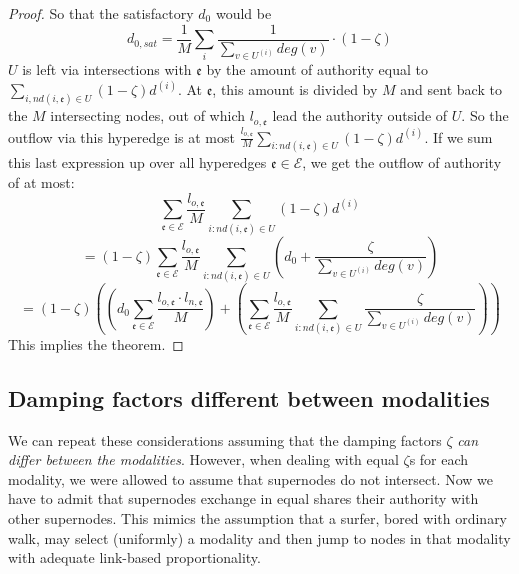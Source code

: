 \documentclass{fundam}
\newcommand{\Bem}[1]{}
\newcommand{\HEM}{\mathcal{E}}
\newcommand{\hem}{\mathfrak{e}}
\begin{document}
\begin{proof}
So that the satisfactory $d_0$ would be
$$ d_{0,sat}=  \frac1M\sum_i\frac{1 }{\sum_{v \in U^{(i)}}deg(v)}{\cdot}(1-\zeta)
 $$
$U$ is left via intersections with $\hem$ by the amount of authority equal to
$\sum_{i, nd(i,\hem)\in U} (1-\zeta)d^{(i)} $.
At $\hem$,  this amount is divided by $M$ and sent back to the $M$ intersecting nodes, out of which $l_{o,\hem}$ lead the authority outside of $U$.  So the outflow via this hyperedge is at most
$\frac{ l_{o,\hem}}{M}\sum_{i: nd(i,\hem)\in U} (1-\zeta)d^{(i)} $.
If we sum this last expression up over all hyperedges $\hem \in \HEM$, we get the outflow of authority of at most:
\begin{equation*}
\sum_{\hem\in\HEM}\frac{ l_{o,\hem}}{M}\sum_{i: nd(i,\hem)\in U} (1-\zeta)d^{(i)}
\end{equation*}
\begin{equation*}
=(1-\zeta)\sum_{\hem\in\HEM}\frac{ l_{o,\hem}}{M}\sum_{i: nd(i,\hem)\in U} \left(d_0+ \frac{\zeta }{\sum_{v \in U^{(i)}}deg(v)} \right)
\end{equation*}
\Bem{
\begin{equation*}
=(1-\zeta)
\left(
\left(d_0\sum_{\hem\in\HEM}\frac{ l_{o,\hem}}{M}\sum_{i: nd(i,\hem)\in U}1 \right)
+
\left(
\sum_{\hem\in\HEM}\frac{ l_{o,\hem}}{M}\sum_{i: nd(i,\hem)\in U}
\frac{\zeta }{\sum_{v \in U^{(i)}}deg(v)} \right)
\right)
\end{equation*}
}%
\begin{equation*}
=(1-\zeta)
\left(
\left(d_0\sum_{\hem\in\HEM}\frac{ l_{o,\hem}\cdot l_{n,\hem}}{M} \right)
+
\left(
\sum_{\hem\in\HEM}\frac{ l_{o,\hem}}{M}\sum_{i: nd(i,\hem)\in U}
\frac{\zeta }{\sum_{v \in U^{(i)}}deg(v)} \right)
\right)
\end{equation*}
This implies the theorem.
\end{proof}


\subsection{Damping factors different between modalities}

We can repeat these considerations assuming that the damping factors $\zeta$ \emph{can differ between the modalities}.
However, when dealing with equal $\zeta$s for each modality, we were allowed to assume that supernodes do not intersect. Now we have to admit that supernodes exchange in equal shares their authority with other supernodes. This mimics the assumption that a surfer, bored with ordinary walk, may select (uniformly) a modality and then jump to nodes in that modality with adequate link-based proportionality.
\end{document}
